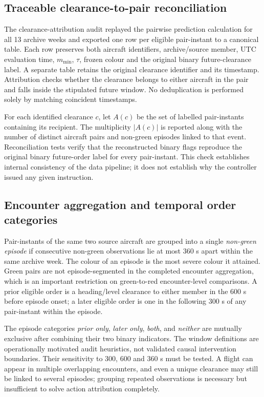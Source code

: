 \documentclass[pdflatex,sn-mathphys-num]{sn-jnl}
\newcommand{\mmin}{m_{\min}}
\begin{document}
\subsection{Traceable clearance-to-pair reconciliation}\label{sec:attribution}
The clearance-attribution audit replayed the pairwise prediction calculation for all 13 archive weeks and exported one row per eligible pair-instant to a canonical table. Each row preserves both aircraft identifiers, archive/source member, UTC evaluation time, $\mmin$, $\tau$, frozen colour and the original binary future-clearance label. A separate table retains the original clearance identifier and its timestamp. Attribution checks whether the clearance belongs to either aircraft in the pair and falls inside the stipulated future window. No deduplication is performed solely by matching coincident timestamps.

For each identified clearance $c$, let $A(c)$ be the set of labelled pair-instants containing its recipient. The multiplicity $|A(c)|$ is reported along with the number of distinct aircraft pairs and non-green episodes linked to that event. Reconciliation tests verify that the reconstructed binary flags reproduce the original binary future-order label for every pair-instant. This check establishes internal consistency of the data pipeline; it does not establish why the controller issued any given instruction.

\subsection{Encounter aggregation and temporal order categories}\label{sec:encounters}
Pair-instants of the same two source aircraft are grouped into a single \emph{non-green episode} if consecutive non-green observations lie at most 360 s apart within the same archive week. The colour of an episode is the most severe colour it attained. Green pairs are not episode-segmented in the completed encounter aggregation, which is an important restriction on green-to-red encounter-level comparisons. A prior eligible order is a heading/level clearance to either member in the 600 s before episode onset; a later eligible order is one in the following 300 s of any pair-instant within the episode.

The episode categories \emph{prior only}, \emph{later only}, \emph{both}, and \emph{neither} are mutually exclusive after combining their two binary indicators. The window definitions are operationally motivated audit heuristics, not validated causal intervention boundaries. Their sensitivity to 300, 600 and 360 s must be tested. A flight can appear in multiple overlapping encounters, and even a unique clearance may still be linked to several episodes; grouping repeated observations is necessary but insufficient to solve action attribution completely.
\end{document}
